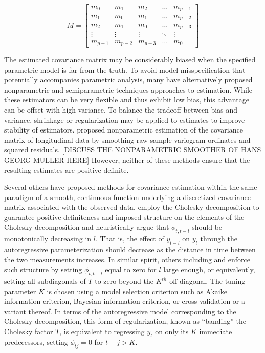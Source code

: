 \documentclass[12pt]{article}
\theoremstyle{definition}
\begin{document}
{{{{\begin{equation}
M = \begin{bmatrix} m_0 & m_1 & m_2 & \dots & m_{p-1}\\ m_1 & m_0 & m_1 & \dots & m_{p-2}\\m_2 & m_1 & m_0 & \dots & m_{p-3}\\ \vdots & \vdots & \vdots & \ddots & \vdots\\  m_{p-1} & m_{p-2} & m_{p-3} & \dots & m_0 \end{bmatrix} \label{toeplitz}
\end{equation}

\bigskip

The estimated covariance matrix may be considerably biased when the specified parametric model is far from the truth.  To avoid model misspecification that potentially accompanies parametric analysis, many have alternatively  proposed nonparametric and semiparametric techniques approaches to estimation.  While these estimators can be very flexible and thus exhibit low bias, this advantage can be offset with high variance.  To balance the tradeoff between bias and variance, shrinkage or regularization may be applied to estimates to improve stability of estimators. \citet{diggle1998nonparametric} proposed nonparametric estimation of the covariance matrix of longitudinal data by smoothing raw sample variogram ordinates and squared residuals.  [DISCUSS THE NONPARAMETRIC SMOOTHER OF HANS GEORG MULLER HERE]  However, neither of these methods ensure that the resulting estimates are positive-definite.  

\bigskip
Several others have proposed methods for covariance estimation within the same paradigm of a smooth, continuous function underlying a discretized covariance matrix associated with the observed data.   \citet{pourahmadi1999joint} employ the Cholesky decomposition to guarantee positive-definiteness and imposed structure on the elements of the Cholesky decomposition and heuristically argue that $\phi_{t,t-l}$ should be monotonically decreasing in $l$. That is, the effect of $y_{t-l}$ on $y_t$ through the autoregressive parameterization should decrease as the distance in time between the two measurements increases. In similar spirit, others including \citet{bickel2008regularized} and \citet{levina2008sparse} enforce such structure by setting $\phi_{t,t-l}$ equal to zero for $l$ large enough, or equivalently, setting all subdiagonals of $T$ to zero beyond the $K^{th}$ off-diagonal. The tuning parameter $K$ is chosen using a model selection criterion such as Akaike information criterion, Bayesian information criterion, or cross validation or a variant thereof.  In terms of the autoregressive model corresponding to the Cholesky decomposition, this form of regularization, known as ``banding'' the Cholesky factor $T$, is equivalent to regressing $y_t$ on only its $K$ immediate predecessors, setting $\phi_{tj} = 0$ for $t-j>K$. 

}}}}
\end{document}
